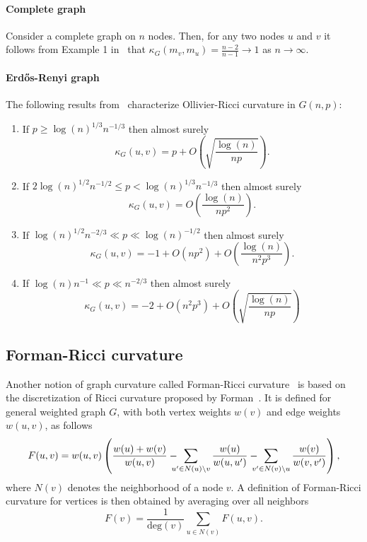 \documentclass{article}
\begin{document}
\paragraph{Complete graph}

Consider a complete graph on $n$ nodes. Then, for any two nodes $u$ and $v$ it follows from Example 1 in~\cite{jost2014ollivier} that $\kappa_G(m_v, m_u) = \frac{n-2}{n-1} \to 1$ as $n \to \infty$.

\paragraph{Erd\H{o}s-Renyi graph}

The following results from~\cite{lin2011ricci} characterize Ollivier-Ricci curvature in $G(n,p)$:

\begin{enumerate}
\item If $p \ge \log(n)^{1/3} n^{-1/3}$ then almost surely
\[
	\kappa_G(u,v) = p + O\left(\sqrt{\frac{\log(n)}{n p}}\right).
\]
\item If $2 \log(n)^{1/2} n^{-1/2} \le p < \log(n)^{1/3} n^{-1/3}$ then almost surely
\[
	\kappa_G(u,v) = O\left(\frac{\log(n)}{n p^2}\right).
\]
\item If $\log(n)^{1/2} n^{-2/3} \ll p \ll \log(n)^{-1/2}$ then almost surely
\[
	\kappa_G(u,v) = -1 + O\left(n p^2\right) + O\left(\frac{\log(n)}{n^2 p^3}\right).
\]
\item If $\log(n) n^{-1} \ll p \ll n^{-2/3}$ then almost surely
\[
	\kappa_G(u,v) = -2 + O\left(n^2 p^3\right) + O\left(\sqrt{\frac{\log(n)}{np}}\right)
\]
\end{enumerate}

\subsection{Forman-Ricci curvature}

Another notion of graph curvature called Forman-Ricci curvature~\cite{sreejith2016forman} is based on the discretization of Ricci curvature proposed by Forman~\cite{forman2003bochner}. It is defined for general weighted graph $G$, with both vertex weights $w(v)$ and edge weights $w(u,v)$, as follows
\begin{equation}\label{eq:def_forman_curvature_edges}
	F(u,v) = w(u,v) \left(\frac{w(u) + w(v)}{w(u,v)} - \hspace{-8pt}\sum_{u^\prime \in N(u)\setminus v}  \frac{w(u)}{w(u,u^\prime)} - \hspace{-8pt} \sum_{v^\prime \in N(v) \setminus u} \frac{w(v)}{w(v,v^\prime)}\right),
\end{equation}
where $N(v)$ denotes the neighborhood of a node $v$. A definition of Forman-Ricci curvature for vertices is then obtained by averaging over all neighbors
\begin{equation}\label{eq:def_forman_curvature_nodes}
	F(v) = \frac{1}{\mathrm{deg}(v)} \sum_{u \in N(v)} F(u,v).
\end{equation}
\end{document}
